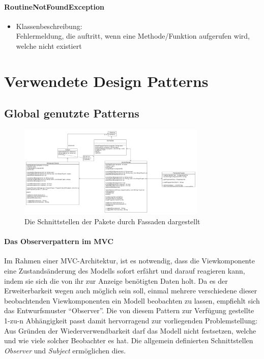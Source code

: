 \documentclass[parskip=full]{scrartcl}
\begin{document}
\paragraph{RoutineNotFoundException}
\begin{itemize}
\item Klassenbeschreibung: \\
Fehlermeldung, die auftritt, wenn eine Methode/Funktion aufgerufen wird, welche nicht existiert
\end{itemize}
\section{Verwendete Design Patterns}\label{Patterns}
\subsection{Global genutzte Patterns}
\begin{figure}[!h]
\centering
\includegraphics[width=0.8\textwidth]{diagrammIdeenUmlet/fassaden.pdf}
\caption{Die Schnittstellen der Pakete durch Fassaden dargestellt}
\label{Terme}
\end{figure}
\paragraph{Das Observerpattern im MVC}
Im Rahmen einer MVC-Architektur, ist es notwendig, dass die Viewkomponente eine Zustandsänderung des Modells sofort erfährt und darauf reagieren kann, indem sie sich die von ihr zur Anzeige benötigten Daten holt. Da es der Erweiterbarkeit wegen auch möglich sein soll, einmal mehrere verschiedene dieser beobachtenden Viewkomponenten ein Modell beobachten zu lassen, empfiehlt sich das Entwurfsmuster \enquote{Observer}. Die von diesem Pattern zur Verfügung gestellte 1-zu-n Abhängigkeit passt damit hervorragend zur vorliegenden Problemstellung: Aus Gründen der Wiederverwendbarkeit darf das Modell nicht festsetzen, welche und wie viele solcher Beobachter es hat. Die allgemein definierten Schnittstellen \textit{Observer} und \textit{Subject} ermöglichen dies. 
\end{document}
